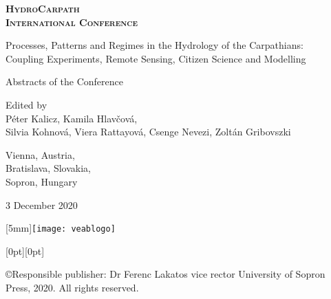 \begin{titlepage}
\centering
\scshape
\large
\bfseries
HydroCarpath \\
International Conference

\vspace{0.5cm}
Processes, Patterns and Regimes in the Hydrology of the Carpathians:\\
Coupling Experiments, Remote Sensing, Citizen Science and Modelling
\upshape
\normalsize
\mdseries

\vspace{1cm}
Abstracts of the Conference

\vspace{3cm}
Edited by\\
Péter Kalicz, Kamila Hlavčová,\\
Silvia Kohnová, Viera Rattayová, Csenge Nevezi, Zoltán Gribovszki


\vfill
Vienna, Austria, \\
Bratislava, Slovakia, \\
Sopron, Hungary

3 December 2020
\end{titlepage}

\newpage{}
\thispagestyle{empty}
\hspace*{\fill} \hspace{4mm} \raisebox{-11mm}[5mm]{\texttt{[image: veablogo]}}


\vspace*{\fill}

\hspace*{\fill} \hspace{1mm} \raisebox{0mm}[0pt][0pt]{}

\noindent{}\copyright{\footnotesize{}Responsible publisher:\newline{} Dr Ferenc Lakatos vice rector\newline{} University of Sopron Press, 2020. All rights reserved.}



\setcounter{page}{2}

\fancyhead[LE,RO]{\thepage}

{}
\tableofcontents{}
\newpage{}

\setcounter{articleid}{0}


{}
\printindex


